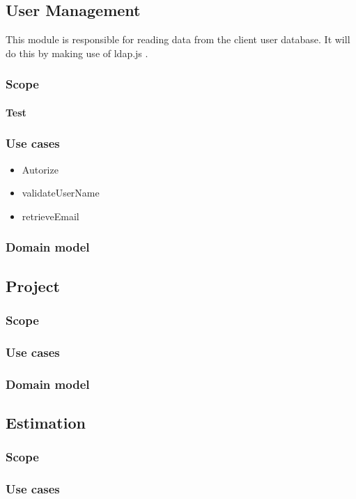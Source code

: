\subsection{User Management}
This module is responsible for reading data from the client user database. It will do this by making use of ldap.js .
\subsubsection{Scope}
\paragraph{Test}
\subsubsection{Use cases}
\begin{itemize}
\item Autorize
\item validateUserName
\item retrieveEmail
\end{itemize}
\subsubsection{Domain model}
\subsection{Project}
\subsubsection{Scope}
\subsubsection{Use cases}
\subsubsection{Domain model}
\subsection{Estimation}
\subsubsection{Scope}
\subsubsection{Use cases}
